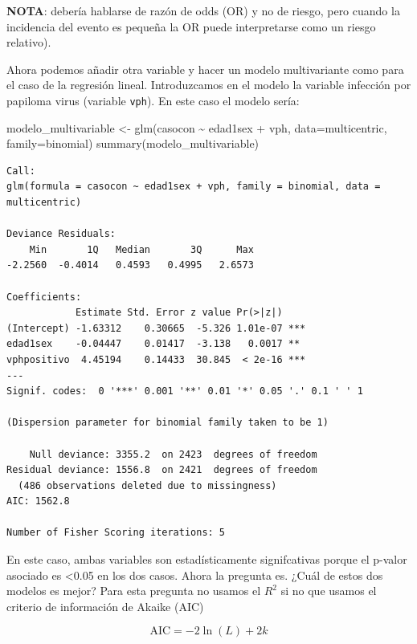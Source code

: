 \documentclass[
]{book}
\newenvironment{Shaded}{\begin{snugshade}}{\end{snugshade}}
\newcommand{\AttributeTok}[1]{\textcolor[rgb]{0.77,0.63,0.00}{#1}}
\newcommand{\FunctionTok}[1]{\textcolor[rgb]{0.00,0.00,0.00}{#1}}
\newcommand{\NormalTok}[1]{#1}
\newcommand{\OtherTok}[1]{\textcolor[rgb]{0.56,0.35,0.01}{#1}}
\newcommand{\SpecialCharTok}[1]{\textcolor[rgb]{0.00,0.00,0.00}{#1}}
\begin{document}
\textbf{NOTA}: debería hablarse de razón de odds (OR) y no de riesgo, pero cuando la incidencia del evento es pequeña la OR puede interpretarse como un riesgo relativo).

Ahora podemos añadir otra variable y hacer un modelo multivariante como para el caso de la regresión lineal. Introduzcamos en el modelo la variable infección por papiloma virus (variable \texttt{vph}). En este caso el modelo sería:

\begin{Shaded}
\begin{Highlighting}[]
\NormalTok{modelo\_multivariable }\OtherTok{\textless{}{-}} \FunctionTok{glm}\NormalTok{(casocon }\SpecialCharTok{\textasciitilde{}}\NormalTok{ edad1sex }\SpecialCharTok{+}\NormalTok{ vph, }\AttributeTok{data=}\NormalTok{multicentric, }\AttributeTok{family=}\NormalTok{binomial)}
\FunctionTok{summary}\NormalTok{(modelo\_multivariable)}
\end{Highlighting}
\end{Shaded}

\begin{verbatim}
Call:
glm(formula = casocon ~ edad1sex + vph, family = binomial, data = multicentric)

Deviance Residuals: 
    Min       1Q   Median       3Q      Max  
-2.2560  -0.4014   0.4593   0.4995   2.6573  

Coefficients:
            Estimate Std. Error z value Pr(>|z|)    
(Intercept) -1.63312    0.30665  -5.326 1.01e-07 ***
edad1sex    -0.04447    0.01417  -3.138   0.0017 ** 
vphpositivo  4.45194    0.14433  30.845  < 2e-16 ***
---
Signif. codes:  0 '***' 0.001 '**' 0.01 '*' 0.05 '.' 0.1 ' ' 1

(Dispersion parameter for binomial family taken to be 1)

    Null deviance: 3355.2  on 2423  degrees of freedom
Residual deviance: 1556.8  on 2421  degrees of freedom
  (486 observations deleted due to missingness)
AIC: 1562.8

Number of Fisher Scoring iterations: 5
\end{verbatim}

En este caso, ambas variables son estadísticamente signifcativas porque el p-valor asociado es \textless0.05 en los dos casos. Ahora la pregunta es. ¿Cuál de estos dos modelos es mejor? Para esta pregunta no usamos el \(R^2\) si no que usamos el criterio de información de Akaike (AIC)

\[\mathrm {AIC} = - 2 \ln(L) + 2k\]
\end{document}
